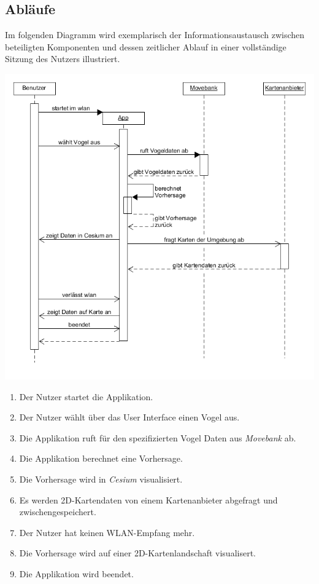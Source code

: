 \documentclass[12pt]{article} %
\newenvironment{cptenumerate}[1][label=\arabic*.]{\begin{enumerate}[#1] \setlength\itemsep{0em}}{\end{enumerate}}
\begin{document}
\subsection{Abläufe}

Im folgenden Diagramm wird exemplarisch der Informationsaustausch zwischen beteiligten Komponenten und dessen zeitlicher Ablauf in einer vollständige Sitzung des Nutzers illustriert. 

\includegraphics[width = 1\linewidth]{Sequenzdiagramm.png}

\begin{cptenumerate} 
 	 \item Der Nutzer startet die Applikation.
 	 \item Der Nutzer wählt über das User Interface einen Vogel aus.
 	 \item Die Applikation ruft für den spezifizierten Vogel Daten aus \textit{Movebank} ab.
 	 \item Die Applikation berechnet eine Vorhersage.
 	 \item Die Vorhersage wird in \textit{Cesium} visualisiert.
 	 \item Es werden 2D-Kartendaten von einem Kartenanbieter abgefragt und zwischengespeichert.
 	 \item Der Nutzer hat keinen WLAN-Empfang mehr.
 	 \item Die Vorhersage wird auf einer 2D-Kartenlandschaft visualisert.
 	 \item Die Applikation wird beendet.
\end{cptenumerate} 
\end{document}
